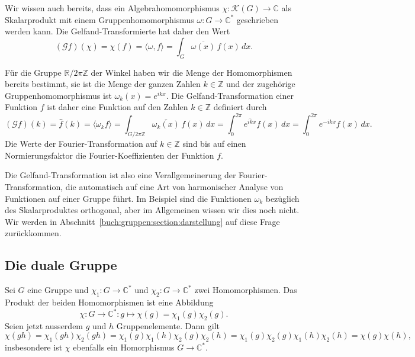 Wir wissen auch bereits, dass ein Algebrahomomorphismus
$\chi\colon \mathscr{K}(G)\to\mathbb{C}$ als Skalarprodukt mit
einem Gruppenhomomorphismus 
$\omega\colon G\to\mathbb{C}^*$ geschrieben werden kann.
Die Gelfand-Transformierte hat daher den Wert
\[
(\mathscr{G}f)(\chi)
=
\chi(f)
=
\langle \omega ,f\rangle
=
\int_G \overline{\omega(x)}\,f(x)\,dx.
\]

\begin{beispiel}
Für die Gruppe $\mathbb{R}/2\pi\mathbb{Z}$ der Winkel haben wir die
Menge der Homomorphismen bereits bestimmt, sie ist die Menge der
ganzen Zahlen $k\in\mathbb{Z}$ und der zugehörige Gruppenhomomorphismus
ist $\omega_k(x) = e^{ikx}$.
Die Gelfand-Transformation einer Funktion $f$ ist daher eine Funktion
auf den Zahlen $k\in \mathbb{Z}$ definiert durch
\[
(\mathscr{G}f)(k)
=
\hat{f}(k)
=
\langle \omega_k f\rangle
=
\int_{G/2\pi \mathbb{Z}} \overline{\omega_k(x)}\, f(x) \,dx
=
\int_0^{2\pi} \overline{e^{ikx}} f(x)\,dx
=
\int_0^{2\pi} e^{-ikx} f(x)\,dx.
\]
Die Werte der Fourier-Transformation auf $k\in\mathbb{Z}$ sind bis auf einen
Normierungsfaktor die Fourier-Koeffizienten der Funktion $f$.
\end{beispiel}

Die Gelfand-Transformation ist also eine Verallgemeinerung der
Fourier-Transformation, die automatisch auf eine Art von harmonischer
Analyse von Funktionen auf einer Gruppe führt.
Im Beispiel sind die Funktionen $\omega_k$ bezüglich des
Skalarproduktes orthogonal, aber im Allgemeinen wissen wir dies 
noch nicht.
Wir werden in Abschnitt~\ref{buch:gruppen:section:darstellung}
auf diese Frage zurückkommen.

%
%
\subsection{Die duale Gruppe
\label{buch:gruppen:gelfand:subsection:dual}}
Sei $G$ eine Gruppe und $\chi_1\colon G\to\mathbb{C}^*$
und $\chi_2\colon G\to\mathbb{C}^*$ zwei Homomorphismen.
Das Produkt der beiden Homomorphismen ist eine Abbildung
\[
\chi\colon G\to\mathbb{C}^*
:
g\mapsto \chi(g)=\chi_1(g)\chi_2(g).
\]
Seien jetzt ausserdem $g$ und $h$ Gruppenelemente.
Dann gilt
\begin{equation}
\chi(gh)
=
\chi_1(gh)\chi_2(gh)
=
\chi_1(g)\chi_1(h)\chi_2(g)\chi_2(h)
=
\chi_1(g)\chi_2(g)\chi_1(h)\chi_2(h)
=
\chi(g)\chi(h),
\label{buch:gruppen:gelfand:eqn:prodhomo}
\end{equation}
insbesondere ist $\chi$ ebenfalls ein Homorphismus $G\to\mathbb{C}^*$.

